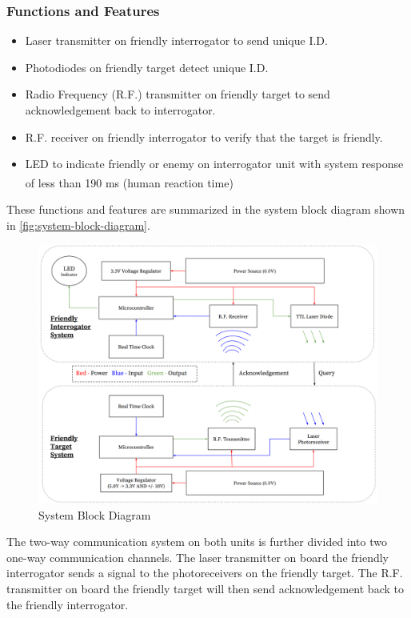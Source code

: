 \documentclass[letterpaper,10pt]{article}
\begin{document}
\begin{spacing}{1.15}
\subsubsection{Functions and Features}
\begin{itemize}
	\item Laser transmitter on friendly interrogator to send unique I.D.
	\item Photodiodes on friendly target detect unique I.D.
	\item Radio Frequency (R.F.) transmitter on friendly target to send acknowledgement back to interrogator.
	\item R.F. receiver on friendly interrogator to verify that the target is friendly.
	\item LED to indicate friendly or enemy on interrogator unit with system response of less than 190 ms (human reaction time\textsuperscript{\cite{Reaction_Times}})
\end{itemize}

These functions and features are summarized in the system block diagram shown in \autoref{fig:system-block-diagram}. 

\begin{figure} [H]
	\centering
	\includegraphics[scale=0.45]{System_Block_Diagram.png}
	\caption{System Block Diagram\label{fig:system-block-diagram}}
\end{figure}

The two-way communication system on both units is further divided into two one-way communication channels. The laser transmitter on board the friendly interrogator sends a signal to the photoreceivers on the friendly target. The R.F. transmitter on board the friendly target will then send acknowledgement back to the friendly interrogator. 


\end{spacing}
\end{document}
